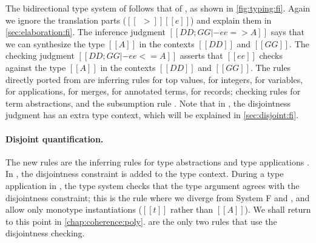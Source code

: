 The bidirectional type system of \fnamee follows that of \namee, as shown
in \cref{fig:typing:fi}. Again we ignore the translation parts ($[[~~>]] [[e]]$) and explain them in
\cref{sec:elaboration:fi}. The inference judgment $[[ DD; GG |- ee => A  ]]$
says that we can synthesize the type $[[A]]$ in the contexts $[[DD]]$ and $[[GG]]$. The checking judgment
$[[ DD ; GG |- ee <= A  ]]$ asserts that $[[ee]]$ checks against the type $[[A]]$
in the contexts $[[DD]]$ and $[[GG]]$. The rules directly ported from \namee are inferring rules  for top values,
 for integers,  for variables,  for applications,  for merges,
 for annotated terms,  for records; checking rules  for term abstractions, and
the subsumption rule . Note that in , the disjointness judgment has an extra type context, which will be
explained in \cref{sec:disjoint:fi}.

\paragraph{Disjoint quantification.}

The new rules are the inferring rules for type abstractions  and
type applications . In , the disjointness
constraint is added to the type context. During a type application in
, the type system checks that the type argument agrees with the
disjointness constraint; this is the rule where we diverge from System F and
\fname, and allow only monotype instantiations ($[[t]]$ rather than $[[A]]$).  We shall return to this point in
\cref{chap:coherence:poly}.  are the
only two rules that use the disjointness checking.



